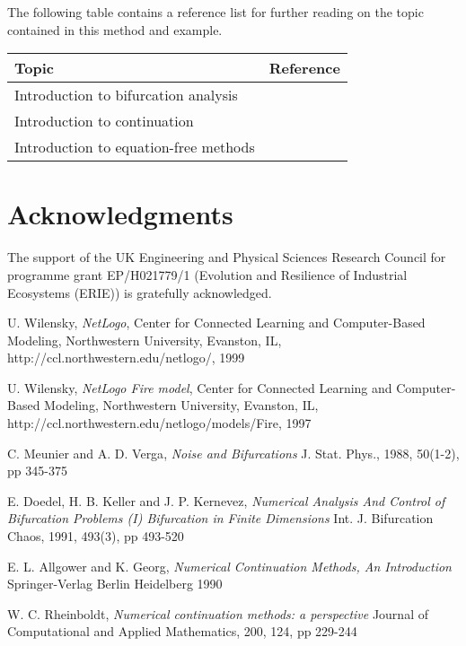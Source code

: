 \documentclass[11pt]{article}
\begin{document}
{The following table contains a reference list for further reading on the topic contained in this method and example. 
\begin{center}
\begin{tabular}{|l|c|}
\hline
Topic									&	Reference \\ \hline
Introduction to bifurcation analysis		&	\cite{Meunier1988}	\\
Introduction to continuation 			&	\cite{Doedel1991,Allgower1990,Rheinboldt2000,Krauskopf2007} \\ 
Introduction to equation-free methods	&	\cite{Theodoropoulos2000,Kevrekidis2003,Kevrekidis2009} \\
\hline
\end{tabular}
\end{center}



\section*{Acknowledgments}
{The support of the UK Engineering and Physical Sciences Research Council for programme grant EP/H021779/1 (Evolution and Resilience of Industrial Ecosystems (ERIE)) is gratefully acknowledged.}
 
 
\begin{thebibliography}{10}  
{\sc U. Wilensky}, 
{\it NetLogo},
Center for Connected Learning and Computer-Based Modeling, Northwestern University, Evanston, IL,
http://ccl.northwestern.edu/netlogo/,
1999

{\sc U. Wilensky}, 
{\it NetLogo Fire model},
Center for Connected Learning and Computer-Based Modeling, Northwestern University, Evanston, IL,
http://ccl.northwestern.edu/netlogo/models/Fire,
1997

{\sc C. Meunier and A. D. Verga},
{\it Noise and Bifurcations}
J. Stat. Phys., 1988, 50(1-2), pp 345-375

{\sc E. Doedel, H. B. Keller and J. P. Kernevez},
{\it Numerical Analysis And Control of Bifurcation Problems (I) Bifurcation in Finite Dimensions}
Int. J. Bifurcation Chaos, 1991, 493(3), pp 493-520

{\sc E. L. Allgower and K. Georg},
{\it Numerical Continuation Methods, An Introduction}
Springer-Verlag Berlin Heidelberg 1990

{\sc W. C. Rheinboldt},
{\it Numerical continuation methods: a perspective}
Journal of Computational and Applied Mathematics, 200, 124, pp 229-244


\end{thebibliography}}
\end{document}
